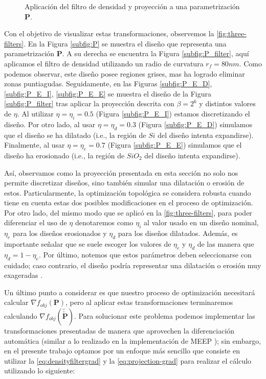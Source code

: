 \begin{figure}[ht]
  \caption{Aplicación del filtro de densidad y proyección a una parametrización $\boldsymbol{P}.$}
  \label{fig:three-filters}
\end{figure}

Con el objetivo de visualizar estas transformaciones, observemos la \autoref{fig:three-filters}.
En la Figura \autoref{subfig:P} se muestra el diseño que representa una parametrización $\boldsymbol{P}$.
A su derecha se encuentra la Figura \autoref{subfig:P_filter}, aquí aplicamos el filtro de densidad
utilizando un radio de curvatura $r_f = 80 nm$. Como podemos observar, este diseño posee regiones grises,
mas ha logrado eliminar zonas puntiagudas.
Seguidamente, en las Figuras \autoref{subfig:P_E_D}, \autoref{subfig:P_E_I}, \autoref{subfig:P_E_E}
se muestra el diseño de la Figura \autoref{subfig:P_filter} tras aplicar la proyección descrita con
$\beta = 2^6$ y distintos valores de $\eta$.
Al utilizar $\eta = \eta_i = 0.5$ (Figura \autoref{subfig:P_E_I}) 
estamos discretizando el diseño.
Por otro lado, al usar $\eta = \eta_d = 0.3$ (Figura \autoref{subfig:P_E_D})
simulamos que el diseño se ha dilatado 
(i.e., la región de $Si$ del diseño intenta expandirse).
Finalmente, al usar $\eta = \eta_e = 0.7$ (Figura \autoref{subfig:P_E_E})
simulamos que el diseño ha erosionado 
(i.e., la región de $SiO_2$ del diseño intenta expandirse).


Así, observamos como la proyección presentada en esta sección no solo nos permite discretizar diseños,
sino también simular una dilatación o erosión de estos.
Particularmente, la optimización topológica se considera robusta cuando
tiene en cuenta estas dos posibles modificaciones en el proceso de optimización.
Por otro lado, del mismo modo que se aplicó en la \autoref{fig:three-filters}, para poder diferenciar 
el uso de $\eta$ denotaremos como $\eta_i$ al valor usado en un diseño nominal, 
$\eta_e$ para los diseños erosionados y $\eta_d$ para los diseños dilatados.
Además, es importante señalar que se suele escoger los valores de $\eta_e$ y $\eta_d$
de las manera que $\eta_d = 1 - \eta_e$.
Por último, notemos que estos parámetros deben seleccionarse con cuidado; 
caso contrario, el diseño podría representar una dilatación o erosión muy exageradas  \citep{Lazarov2016}.

Un último punto a considerar es que nuestro proceso de optimización necesitará calcular 
$\nabla f_{obj}(\boldsymbol{P})$, pero al aplicar estas transformaciones terminaremos calculando
$\nabla f_{obj}(\widetilde{\widetilde{\boldsymbol{P}}})$.
Para solucionar este problema podemos implementar las transformaciones presentadas 
de manera que aprovechen la diferenciación automática (similar a lo realizado en la implementación
de MEEP \citep{Oskooi2010}); sin embargo, en el presente trabajo optamos por un enfoque más sencillo
que consiste en utilizar la \autoref{eq:densityfiltergrad} y la \autoref{eq:projection-grad} 
para realizar el cálculo utilizando lo siguiente:

